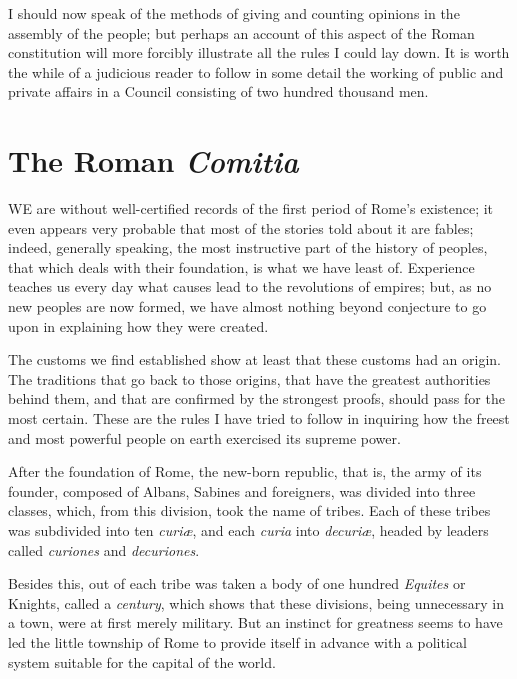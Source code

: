 \documentclass[12pt]{book}
\begin{document}
I should now speak of the methods of giving and counting opinions in the assembly of the people; but perhaps an account of this aspect of the Roman constitution will more forcibly illustrate all the rules I could lay down. It is worth the while of a judicious reader to follow in some detail the working of public and private affairs in a Council consisting of two hundred thousand men.

\section{The Roman \textit{Comitia}}
WE are without well-certified records of the first period of Rome's existence; it even appears very probable that most of the stories told about it are fables; indeed, generally speaking, the most instructive part of the history of peoples, that which deals with their foundation, is what we have least of. Experience teaches us every day what causes lead to the revolutions of empires; but, as no new peoples are now formed, we have almost nothing beyond conjecture to go upon in explaining how they were created.

The customs we find established show at least that these customs had an origin. The traditions that go back to those origins, that have the greatest authorities behind them, and that are confirmed by the strongest proofs, should pass for the most certain. These are the rules I have tried to follow in inquiring how the freest and most powerful people on earth exercised its supreme power.

After the foundation of Rome, the new-born republic, that is, the army of its founder, composed of Albans, Sabines and foreigners, was divided into three classes, which, from this division, took the name of tribes. Each of these tribes was subdivided into ten \textit{curiæ}, and each \textit{curia} into \textit{decuriæ}, headed by leaders called \textit{curiones} and \textit{decuriones}.

Besides this, out of each tribe was taken a body of one hundred \textit{Equites} or Knights, called a \textit{century}, which shows that these divisions, being unnecessary in a town, were at first merely military. But an instinct for greatness seems to have led the little township of Rome to provide itself in advance with a political system suitable for the capital of the world.
\end{document}
